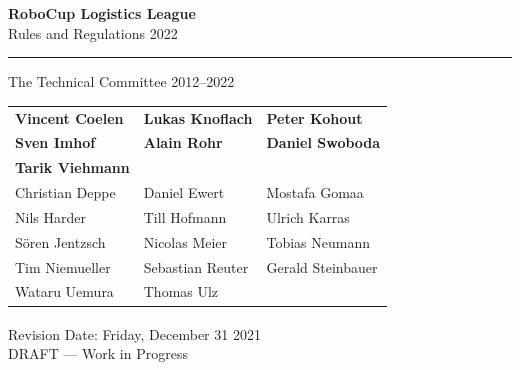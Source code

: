 \documentclass[12pt,twoside]{article}
\begin{document}
\hypersetup{pageanchor=false}


\begin{titlepage}
  \vspace*{5cm}
  \begin{center}
    \begin{LARGE}

      {\bf RoboCup Logistics League}\\[2ex]
      {\Large Rules and Regulations 2022}\\[4ex]
    \end{LARGE}
    \hrule

    {\LARGE\vspace*{4ex}}
    \begin{Large}
      The Technical Committee 2012--2022\\[6ex]
    \end{Large}
    \begin{tabular}{lll}
      \textbf{Vincent Coelen}&\textbf{Lukas Knoflach}&\textbf{Peter Kohout}\\
      \textbf{Sven Imhof}&\textbf{Alain Rohr}&\textbf{Daniel Swoboda}\\
      \textbf{Tarik Viehmann}& &\\[.5em]
      Christian Deppe
      &Daniel Ewert
      &Mostafa Gomaa
      \\
      Nils Harder
      &Till Hofmann
      &Ulrich Karras
      \\
      S\"oren Jentzsch
      &Nicolas Meier
      &Tobias Neumann
      \\
      Tim Niemueller
      &Sebastian Reuter
      &Gerald Steinbauer
      \\
      Wataru Uemura
      &Thomas Ulz
      &
      \\
    \end{tabular}
    \vfill
    Revision Date: Friday, December 31\textsuperscript{}
    2021
    \\ DRAFT --- Work in Progress
  \end{center}
\end{titlepage}
\thispagestyle{empty}
\pagebreak
\clearpage

\hypersetup{pageanchor=true}
\setcounter{page}{1}
\tableofcontents
\newpage
\cleardoublepage{}

\setcounter{page}{1}
\end{document}
